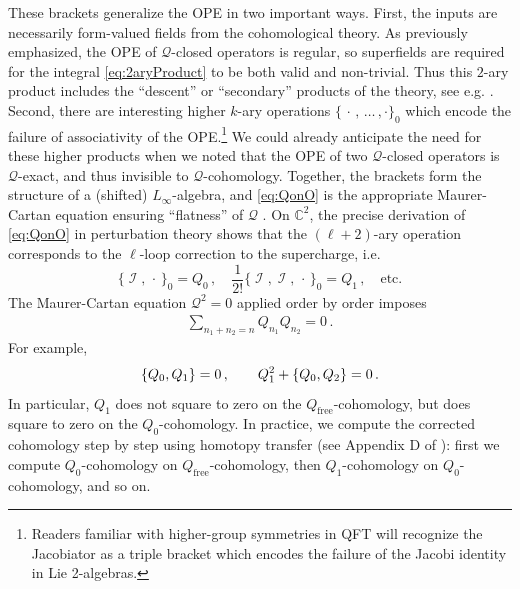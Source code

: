 \documentclass[11pt]{article}
\DeclareMathOperator{\calI}{\mathcal{I}}
\def\bbC{\mathbb{C}}
\renewcommand{\bm}{\mathcal}
\begin{document}
These brackets generalize the OPE in two important ways. First, the inputs are necessarily form-valued fields from the cohomological theory. As previously emphasized, the OPE of $\bm{Q}$-closed operators is regular, so superfields are required for the integral \eqref{eq:2aryProduct} to be both valid and non-trivial. Thus this $2$-ary product includes the ``descent'' or ``secondary'' products of the theory, see e.g. \cite{Witten:1992yj,Lian:1992mn, Getzler:1994yd, Beem:2018fng, Oh:2019mcg, Garner:2022its}. Second, there are interesting higher $k$-ary operations $\{\,\cdot\,,\,\dots\,,\cdot\}_0$ which encode the failure of associativity of the OPE.\footnote{Readers familiar with higher-group symmetries in QFT will recognize the Jacobiator as a triple bracket which encodes the failure of the Jacobi identity in Lie 2-algebras.} We could already anticipate the need for these higher products when we noted that the OPE of two $\bm{Q}$-closed operators is $\bm{Q}$-exact, and thus invisible to $\bm{Q}$-cohomology. Together, the brackets form the structure of a (shifted) $L_\infty$-algebra, and \eqref{eq:QonO} is the appropriate Maurer-Cartan equation ensuring ``flatness'' of $\bm{Q}$ \cite{Gaiotto:2015aoa, Gaiotto:2024gii}. On $\bbC^2$, the precise derivation of \eqref{eq:QonO} in perturbation theory shows that the $(\ell+2)$-ary operation corresponds to the $\ell$-loop correction to the supercharge, i.e.
\begin{equation}
    \{\calI,\,\cdot\,\}_0 = Q_{0}\,,\quad
    \frac{1}{2!}\{\calI,\calI,\,\cdot\,\}_0 = Q_{1}\,,\quad
    \text{etc.}
\end{equation}
The Maurer-Cartan equation $\bm{Q}^2=0$ applied order by order imposes 
\begin{align}
    \sum_{n_1+n_2=n} Q_{n_1} Q_{n_2} = 0 \, .
\end{align}
For example,
\begin{align}
    \qty{Q_0,Q_1} = 0 \, , \qquad Q_1^2 + \qty{ Q_0 , Q_2} = 0 \, .
\end{align}
In particular, $Q_1$ does not square to zero on the $Q_\text{free}$-cohomology, but does square to zero on the $Q_0$-cohomology. In practice, we compute the corrected cohomology step by step using homotopy transfer (see Appendix D of \cite{Budzik:2023xbr}): first we compute $Q_0$-cohomology on $Q_{\text{free}}$-cohomology, then $Q_1$-cohomology on $Q_0$-cohomology, and so on.
\end{document}
